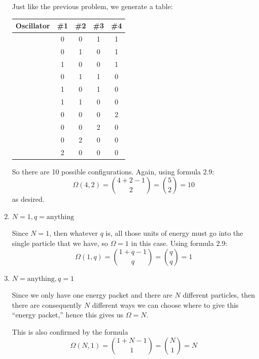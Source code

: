 \documentclass[10pt]{article}
\begin{document}
\begin{enumerate}[label=\alph*)]
			\begin{solution}
				Just like the previous problem, we generate a table:
				\begin{center}
					\begin{tabular}{c|c|c|c|c}
						Oscillator & \#1 & \#2 & \#3 & \#4\\
						\hline
								   & 0 & 0 & 1 & 1\\
								   & 0 & 1 & 0 & 1\\
								   & 1 & 0 & 0 & 1\\
								   & 0 & 1 & 1 & 0\\
								   & 1 & 0 & 1 & 0\\
								   & 1 & 1 & 0 & 0\\
								   & 0 & 0 & 0 & 2\\
								   & 0 & 0 & 2 & 0\\
								   & 0 & 2 & 0 & 0\\
								   & 2 & 0 & 0 & 0
					\end{tabular}
				\end{center}
				So there are 10 possible configurations. Again, using formula 2.9:
				\[
					\Omega(4, 2) = {4 + 2 - 1 \choose 2} = {5 \choose 2} = 10
				\] 
				as desired.
			\end{solution}
			\addtocounter{enumi}{1}
		\item $N = 1, q = \text{anything}$

			\begin{solution}
				Since $N = 1$, then whatever $q$ is, all those units of energy must go into the single 
				particle that we have, so $\Omega = 1$ in this case. Using formula 2.9:
				\[
					\Omega(1, q) = {1 + q - 1 \choose q} = {q \choose q} = 1
				\] 
			\end{solution}
		\item $N = \text{anything}, q = 1$

			\begin{solution}
				Since we only have one energy packet and there are $N$ different particles, then there are 
				consequently $N$ different ways we can choose where to give this ``energy packet,'' hence 
				this gives us $\Omega = N$. 

				This is also confirmed by the formula 
				\[
					\Omega(N, 1) = {1 + N - 1 \choose 1} = {N \choose 1} = N
				\]
			\end{solution}
	\end{enumerate}

	\pagebreak
\end{document}
